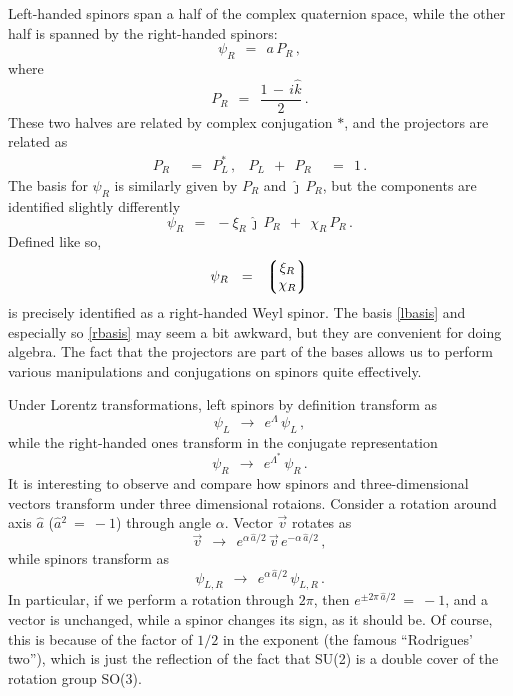 \documentclass[epsfig,12pt]{article}
\newcommand{\jj}{\hat\jmath}
\newcommand{\kk}{\hat k}
\begin{document}
	Left-handed spinors span a half of the complex quaternion space, while the other half
	is spanned by the right-handed spinors:
\begin{equation}
	\psi_R	~~=~~	a\,P_R\,,
\end{equation}
	where
\begin{equation}
	P_R	~~=~~	\frac{1 \,-\, i\kk} 2\,.
\end{equation}
	These two halves are related by complex conjugation $ * $,
	and the projectors are related as
\begin{align}
	P_R	& ~~=~~	P_L^*\,,
	&
	P_L  ~~+~~  P_R	& ~~=~~ 1\,.
\end{align}
	The basis for $ \psi_R $ is similarly given by $ P_R $ and $ \jj\,P_R $, but the
	components are identified slightly differently
\begin{equation}
\label{rbasis}
	\psi_R	~~=~~	-\xi_R\,\jj\,P_R  ~~+~~  \chi_R\,P_R\,.
\end{equation}
	Defined like so,
\begin{equation}
	\psi_R	~~=~~	\left\lgroup
				\begin{matrix}
					\xi_R \\
					\chi_R
                		\end{matrix}
			\right\rgroup
\end{equation}
	is precisely identified as a right-handed Weyl spinor.
	The basis \eqref{lbasis} and especially so \eqref{rbasis} may seem a bit awkward,
	but they are convenient for doing algebra.
	The fact that the projectors are part of the bases allows us to perform
	various manipulations and conjugations on spinors quite effectively.

	Under Lorentz transformations, left spinors by definition transform as
\begin{equation}
	\psi_L	~~\to~~		e^\Lambda\, \psi_L\,,
\end{equation}
	while the right-handed ones transform in the conjugate representation
\begin{equation}
	\psi_R	~~\to~~		e^{\Lambda^*}\, \psi_R\,.
\end{equation}
	It is interesting to observe and compare how spinors and three-dimensional vectors
	transform under three dimensional rotaions.
	Consider a rotation around axis $ \hat a $ ($ \hat a{}^2 ~=~ -1 $) through angle $ \alpha $.
	Vector $ \vec v $ rotates as
\begin{equation}
	\vec v	~~\to~~		e^{\alpha\, \hat a/2}\, \vec v\, e^{-\alpha\, \hat a/2}\,,
\end{equation}
	while spinors transform as
\begin{equation}
	\psi_{L,R}	~~\to~~	e^{\alpha\, \hat a/2}\, \psi_{L,R}\,.
\end{equation}
	In particular, if we perform a rotation through $ 2\pi $, then
	$ e^{\pm 2\pi\,\hat a/2} ~=~ -1 $, and a vector is unchanged,
	while a spinor changes its sign, as it should be.
	Of course, this is because of the factor of $ 1/2 $ in the exponent (the famous ``Rodrigues' two''), which
	is just the reflection of the fact that SU(2) is a double cover of
	the rotation group SO(3).
\end{document}
